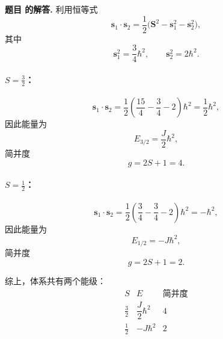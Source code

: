 \documentclass[12pt, a4paper, oneside]{ctexart}
\newcounter{problemname}
\newenvironment{solution}
  {\par\noindent\textbf{题目 \theproblemname 的解答. }}
  {\par}
\begin{document}
\begin{solution}
利用恒等式
\[
\boldsymbol{s}_1\cdot\boldsymbol{s}_2
=\frac12\bigl(
\boldsymbol{S}^2-\boldsymbol{s}_1^2-\boldsymbol{s}_2^2
\bigr),
\]
其中
\[
\boldsymbol{s}_1^2=\frac34\hbar^2,
\qquad
\boldsymbol{s}_2^2=2\hbar^2.
\]

\paragraph{$S=\frac32$：}
\[
\boldsymbol{s}_1\cdot\boldsymbol{s}_2
=\frac12\left(\frac{15}{4}-\frac34-2\right)\hbar^2
=\frac12\hbar^2,
\]
因此能量为
\[
E_{3/2}=\frac{J}{2}\hbar^2,
\]
简并度
\[
g=2S+1=4.
\]

\paragraph{$S=\frac12$：}
\[
\boldsymbol{s}_1\cdot\boldsymbol{s}_2
=\frac12\left(\frac34-\frac34-2\right)\hbar^2
=-\hbar^2,
\]
因此能量为
\[
E_{1/2}=-J\hbar^2,
\]
简并度
\[
g=2S+1=2.
\]

\medskip
\noindent
综上，体系共有两个能级：
\[
\boxed{
\begin{array}{c|c|c}
S & E & \text{简并度} \\
\hline
\frac32 & \dfrac{J}{2}\hbar^2 & 4 \\
\frac12 & -J\hbar^2 & 2
\end{array}
}
\]
\end{solution}
\end{document}
